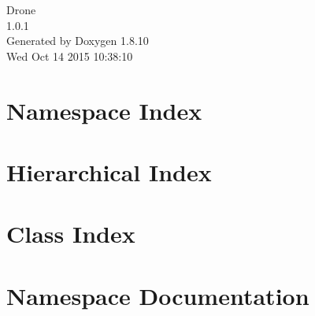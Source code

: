 \documentclass[twoside]{book}
\newcommand{\+}{\discretionary{\mbox{\scriptsize$\hookleftarrow$}}{}{}}
\newcommand{\clearemptydoublepage}{%
  \newpage{\pagestyle{empty}\cleardoublepage}%
}
\begin{document}
\hypersetup{pageanchor=false,
             bookmarks=true,
             bookmarksnumbered=true,
             pdfencoding=unicode
            }
\begin{titlepage}
\vspace*{7cm}
\begin{center}%
{\Large Drone \\[1ex]\large 1.\+0.\+1 }\\
\vspace*{1cm}
{\large Generated by Doxygen 1.8.10}\\
\vspace*{0.5cm}
{\small Wed Oct 14 2015 10:38:10}\\
\end{center}
\end{titlepage}
\clearemptydoublepage
\tableofcontents
\clearemptydoublepage
{}
\hypersetup{pageanchor=true}

\chapter{Namespace Index}

\chapter{Hierarchical Index}

\chapter{Class Index}

\chapter{Namespace Documentation}














\end{document}
